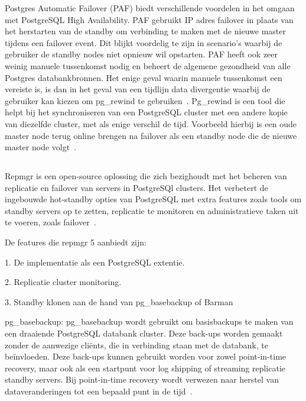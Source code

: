 Postgres Automatic Failover (PAF) biedt verschillende voordelen in het omgaan met PostgreSQL High Availability. PAF gebruikt IP adres failover in plaats van het herstarten van de standby om verbinding te maken met de nieuwe master tijdens een failover event. Dit blijkt voordelig te zijn in scenario's waarbij de gebruiker de standby nodes niet opnieuw wil opstarten. PAF heeft ook zeer weinig manuele tussenkomst nodig en beheert de algemene gezondheid van alle Postgres databankbronnen. Het enige geval waarin manuele tussenkomst een vereiste is, is dan in het geval van een tijdlijn data divergentie waarbij de gebruiker kan kiezen om pg\_rewind te gebruiken~\autocite{ScaleGrid2018a}. Pg\_rewind is een tool die helpt bij het synchroniseren van een PostgreSQL cluster met een andere kopie van diezelfde cluster, met als enige verschil de tijd. Voorbeeld hierbij is een oude master node terug online brengen na failover als een standby node die de nieuwe master node volgt~\autocite{PostgreSQL2021b}. %

\subsection{}
\label{subsec:RepMgr [Replication Manager]}

Repmgr is een open-source oplossing die zich bezighoudt met het beheren van replicatie en failover van servers in PostgreSQl clusters. Het verbetert de ingebouwde hot-standby opties van PostgreSQL met extra features zoals tools om standby servers op te zetten, replicatie te monitoren en administratieve taken uit te voeren, zoals failover~\autocite{2021a}. %

De features die repmgr 5 aanbiedt zijn:

1. De implementatie als een PostgreSQL extentie.

2. Replicatie cluster monitoring.

3. Standby klonen aan de hand van pg\_basebackup of Barman

pg\_basebackup: pg\_basebackup wordt gebruikt om basisbackups te maken van een draaiende PostgreSQL databank cluster. Deze back-ups worden gemaakt zonder de aanwezige cliënts, die in verbinding staan met de databank, te beïnvloeden. Deze back-ups kunnen gebruikt worden voor zowel point-in-time recovery, maar ook als een startpunt voor log shipping of streaming replicatie standby servers. Bij point-in-time recovery wordt verwezen naar herstel van dataveranderingen tot een bepaald punt in de tijd~\autocite{MySQL2021}. %


